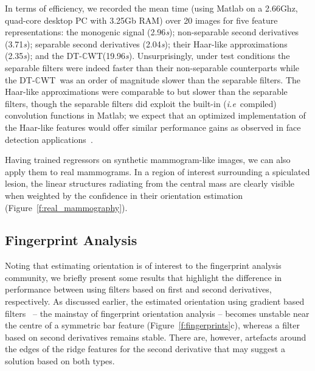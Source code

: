 \documentclass{bmvc2k}
\def\ie{\emph{i.e}\bmvaOneDot}
\newcommand{\fref}[1]{Figure~\ref{#1}}
\def\dtcwt{DT-$\mathbb{C}$WT}
\begin{document}
In terms of efficiency, we recorded the mean time (using Matlab on a 2.66Ghz, quad-core desktop PC with 3.25Gb RAM) over 20 images for five feature representations: the monogenic signal (2.96\emph{s}); non-separable second derivatives (3.71\emph{s}); separable second derivatives (2.04\emph{s}); their Haar-like approximations (2.35\emph{s}); and the \dtcwt (19.96\emph{s}). Unsurprisingly, under test conditions the separable filters were indeed faster than their non-separable counterparts while the \dtcwt~was an order of magnitude slower than the separable filters. The Haar-like approximations were comparable to but slower than the separable filters, though the separable filters did exploit the built-in (\ie~compiled) convolution functions in Matlab; we expect that an optimized implementation of the Haar-like features would offer similar performance gains as observed in face detection applications~\cite{Viola_Jones_IJCV04}.

Having trained regressors on synthetic mammogram-like images, we can also apply them to real mammograms. In a region of interest surrounding a spiculated lesion, the linear structures radiating from the central mass are clearly visible when weighted by the confidence in their orientation estimation (\fref{f:real_mammography}).


\subsection{Fingerprint Analysis}
\label{s:expts_fingerprints}
Noting that estimating orientation is of interest to the fingerprint analysis community, we briefly present some results that highlight the difference in performance between using filters based on first and second derivatives, respectively. As discussed earlier, the estimated orientation using gradient based filters~\cite{Bazen_Gerez_TPAMI02,Mei_etal_IVC09} -- the mainstay of fingerprint orientation analysis -- becomes unstable near the centre of a symmetric bar feature (\fref{f:fingerprints}c), whereas a filter based on second derivatives remains stable. There are, however, artefacts around the edges of the ridge features for the second derivative that may suggest a solution based on both types.
\end{document}
